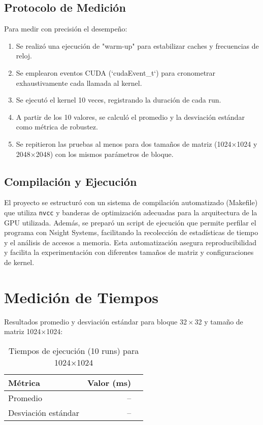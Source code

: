 \documentclass[a4paper,11pt]{article}
\begin{document}
\subsection{Protocolo de Medición}
Para medir con precisión el desempeño:
\begin{enumerate}[noitemsep]
  \item Se realizó una ejecución de "warm-up" para estabilizar caches y frecuencias de reloj.
  \item Se emplearon eventos CUDA (`cudaEvent_t`) para cronometrar exhaustivamente cada llamada al kernel.
  \item Se ejecutó el kernel 10 veces, registrando la duración de cada run.
  \item A partir de los 10 valores, se calculó el promedio y la desviación estándar como métrica de robustez.
  \item Se repitieron las pruebas al menos para dos tamaños de matriz (1024×1024 y 2048×2048) con los mismos parámetros de bloque.
\end{enumerate}

\subsection{Compilación y Ejecución}
El proyecto se estructuró con un sistema de compilación automatizado (Makefile) que utiliza \texttt{nvcc} y banderas de optimización adecuadas para la arquitectura de la GPU utilizada. Además, se preparó un script de ejecución que permite perfilar el programa con Nsight Systems, facilitando la recolección de estadísticas de tiempo y el análisis de accesos a memoria. Esta automatización asegura reproducibilidad y facilita la experimentación con diferentes tamaños de matriz y configuraciones de kernel.

\section{Medición de Tiempos}
Resultados promedio y desviación estándar para bloque 32\,$\times$\,32 y tamaño de matriz 1024×1024:
\begin{table}[H]
\centering
\caption{Tiempos de ejecución (10 runs) para 1024×1024}
\begin{tabular}{lrr}
\toprule
Métrica & Valor (ms) \\
\midrule
Promedio &  --  \\
Desviación estándar &  --  \\
\bottomrule
\end{tabular}
\end{table}
\end{document}
